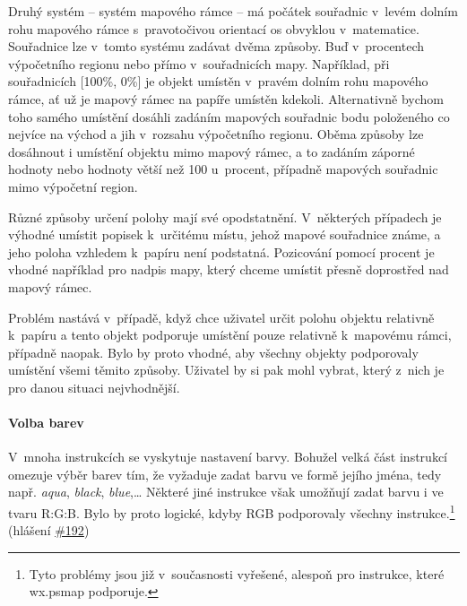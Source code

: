 \documentclass[a4paper,12pt,draft]{article}
\newif\ifbc %
\newcommand{\instr}[1]{\lstinline[style=psmapInline]|#1|}
\begin{document}
Druhý systém -- systém mapového rámce -- má počátek souřadnic
v~levém dolním rohu mapového rámce s~pravotočivou orientací os obvyklou
v~matematice. Souřad\-nice lze v~tomto systému zadávat dvěma způsoby. Buď
v~procentech výpočetního regionu nebo přímo v~souřadnicích
mapy. Například, při souřadnicích [100\%, 0\%] je objekt umístěn
v~pravém dolním rohu mapového rámce, ať už je mapový rámec na papíře
umístěn kdekoli. Alternativně bychom toho samého umístění dosáhli
zadáním mapových souřadnic bodu položeného co nejvíce na východ
a jih v~rozsahu výpočet\-ního regionu. Oběma způsoby lze dosáhnout i
umístění objektu mimo mapový rámec, a to zadáním záporné hodnoty
nebo hodnoty větší než 100 u~procent, případně mapových souřadnic
mimo výpočetní region.

Různé způsoby určení polohy mají své opodstatnění. V~některých
případech je výhodné umístit popisek k~určitému místu, jehož
mapové souřadnice známe, a jeho poloha vzhledem k~papíru není
podstatná. Pozicování pomocí procent je vhodné například pro nadpis
mapy, který chceme umístit přesně doprostřed nad mapový rámec.

Problém nastává v~případě, když chce uživatel určit polohu objektu
relativně k~papíru a tento objekt podporuje umístění pouze relativně
k~mapovému rámci, případně naopak. Bylo by proto vhodné, aby všechny
objekty podporovaly umístění všemi těmito způsoby. Uživatel by si
pak mohl vybrat, který z~nich je pro danou situaci nejvhodnější.

\ifbc
\paragraph*{Referenční bod objektu}
\label{sec:psmap:referencepoint}
Modul ps.map u~většiny objektů nepodporuje volbu referenčního
bodu, tedy bodu objektu, ke kterému se vztahuje zadaná poloha. Výjim\-kou
je text, u~nějž si lze vybrat jeden z~devíti referenčních bodů. Je
zřejmé, že u~textu má tato volba smysl, u~ostatních objektů je otázka,
zda by tato vlastnost byla využívaná.
U~ostatních objektů je referenční bod dán a nelze měnit. Uživatele
však může překvapit, že není u~všech objektů stejný. Ve většině
případů se poloha vztahuje k~levému hornímu rohu objektu, nicméně
grafické měřítko (instrukce \instr{scalebar}) má referenční bod ve
středu. Bylo by vhodné tento přístup sjednotit, na druhou stranu nejde
o~nijak zásadní problém.
\fi

\paragraph*{Volba barev}
\label{sec:psmap:color}
V~mnoha instrukcích se vyskytuje nastavení barvy. Bohužel velká část
instrukcí omezuje výběr barev tím, že vyžaduje zadat barvu ve formě
jejího jména, tedy např. \emph{aqua}, \emph{black}, \emph{blue},\ldots 
Některé jiné instrukce však umožňují zadat barvu i ve tvaru R:G:B. Bylo
by proto logické, kdyby RGB podporovaly všechny instrukce.\footnote{Tyto
problémy jsou již v~současnosti vyřešené, alespoň pro instrukce,
které wx.psmap podporuje.}
(hlášení \href{https://trac.osgeo.org/grass/ticket/192}{\#192})
\end{document}
